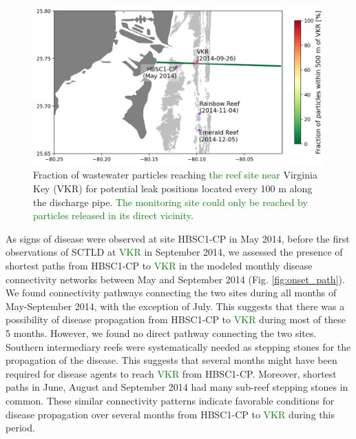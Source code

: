 \documentclass[preprint,12pt,authoryear]{elsarticle}
\newcommand{\modif}[1]{\textcolor{green}{#1}}
\begin{document}
\begin{figure}
	\centering
	\includegraphics[width=.85\textwidth]{figures/fig_pipeline_new.png}
	\caption{Fraction of wastewater particles reaching \modif{the reef site near} Virginia Key (VKR) for potential leak positions located every 100 m along the discharge pipe. \modif{The monitoring site could only be reached by particles released in its direct vicinity}.}
	\label{fig:onset_pipe}
\end{figure}

As signs of disease were observed at site HBSC1-CP in May 2014, before the first observations of SCTLD at \modif{VKR} in September 2014, we assessed the presence of shortest paths from HBSC1-CP to \modif{VKR} in the modeled monthly disease connectivity networks between May and September 2014 (Fig. \ref{fig:onset_path}). We found connectivity pathways connecting the two sites during all months of May-September 2014, with the exception of July. This suggests that there was a possibility of disease propagation from HBSC1-CP to \modif{VKR} during most of these 5 months. However, we found no direct pathway connecting the two sites. Southern intermediary reefs were systematically needed as stepping stones for the propagation of the disease. This suggests that several months might have been required for disease agents to reach \modif{VKR} from HBSC1-CP. Moreover, shortest paths in June, August and September 2014 had many sub-reef stepping stones in common. These similar connectivity patterns indicate favorable conditions for disease propagation over several months from HBSC1-CP to \modif{VKR} during this period.
\end{document}
